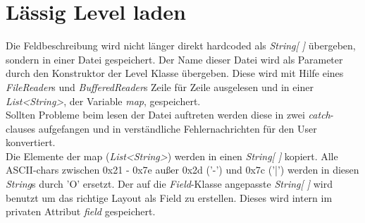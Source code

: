 \documentclass{pi1}
\begin{document}
\section{Lässig Level laden}

Die Feldbeschreibung wird nicht länger direkt hardcoded als \textit{String[ ]} übergeben, sondern in einer Datei gespeichert. Der Name dieser Datei wird als Parameter durch den Konstruktor der Level Klasse übergeben. Diese wird mit Hilfe eines \textit{FileReader}s und \textit{BufferedReader}s Zeile für Zeile ausgelesen und in einer \textit{List<String>}, der Variable \textit{map}, gespeichert.\\


Sollten Probleme beim lesen der Datei auftreten werden diese in zwei \textit{catch}-clauses aufgefangen und in verständliche Fehlernachrichten für den User konvertiert.\\


Die Elemente der map (\textit{List<String>}) werden in einen \textit{String[ ]} kopiert. Alle ASCII-chars zwischen 0x21 - 0x7e außer 0x2d ('-') und 0x7c ('|') werden in diesen \textit{String}s durch 'O' ersetzt. Der auf die \textit{Field}-Klasse angepasste \textit{String[ ]} wird benutzt um das richtige Layout als Field zu erstellen. Dieses wird intern im privaten Attribut \textit{field} gespeichert.
\end{document}
